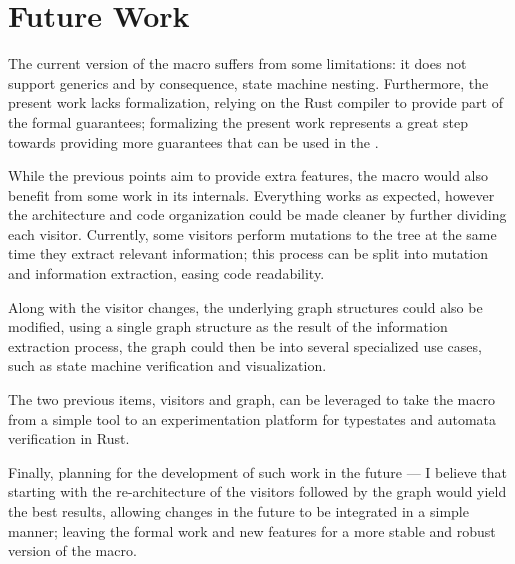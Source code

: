 \section{Future Work}

The current version of the macro suffers from some limitations:
it does not support generics and by consequence, state machine nesting.
Furthermore, the present work lacks formalization, relying on the Rust compiler to provide part of the formal guarantees;
formalizing the present work represents a great step towards providing more guarantees that can be used in the .

While the previous points aim to provide extra features, the macro would also benefit from some work in its internals.
Everything works as expected, however the architecture and code organization could be made cleaner by further dividing each visitor.
Currently, some visitors perform mutations to the tree at the same time they extract relevant information;
this process can be split into mutation and information extraction, easing code readability.

Along with the visitor changes, the underlying graph structures could also be modified,
using a single graph structure as the result of the information extraction process,
the graph could then be  into several specialized use cases, such as state machine verification and visualization.

The two previous items, visitors and graph,
can be leveraged to take the macro from a simple tool to an experimentation platform for typestates and automata verification in Rust.

Finally, planning for the development of such work in the future ---
I believe that starting with the re-architecture of the visitors followed by the graph would yield the best results,
allowing changes in the future to be integrated in a simple manner;
leaving the formal work and new features for a more stable and robust version of the macro.
